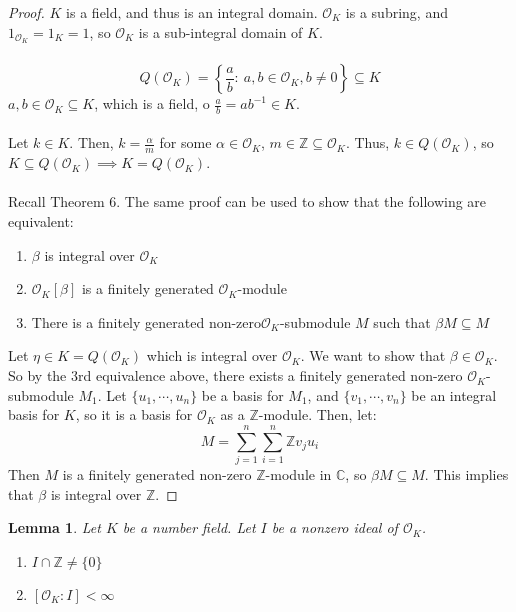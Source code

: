 \documentclass{article}
\newcommand{\C}{\mathbb{C}}
\newcommand{\air}{\mathcal{O}_K}
\newcommand{\Z}{\mathbb{Z}}
\newtheorem{lemma}{Lemma}[subsection]
\begin{document}
\begin{proof}
$K$ is a field, and thus is an integral domain. $\air$ is a subring, and $1_{\air} = 1_K = 1$, so $\air$ is a sub-integral domain of $K$.\\
\\
$$Q(\air)=\left\{\frac{a}{b}:\ a,b\in \air, b\neq 0\right\}\subseteq K$$
$a,b\in\air\subseteq K$, which is a field, o $\frac{a}{b}=ab^{-1}\in K$.
\\
\\
Let $k\in K$. Then, $k=\frac{\alpha}{m}$ for some $\alpha\in\air$, $m\in\Z\subseteq \air$. Thus, $k\in Q(\air)$, so $K\subseteq Q(\air)\implies K=Q(\air)$. \\
\\
Recall Theorem 6. The same proof can be used to show that the following are equivalent:
\begin{enumerate}
    \item $\beta$ is integral over $\air$
    \item $\air[\beta]$ is a finitely generated $\air$-module
    \item There is a finitely generated non-zero$\air$-submodule $M$ such that $\beta M\subseteq M$ 
\end{enumerate}
Let $\eta\in K=Q(\air)$ which is integral over $\air$. We want to show that $\beta\in \air$. So by the 3rd equivalence above, there exists a finitely generated non-zero $\air$-submodule $M_1$. Let $\{u_1,\cdots, u_n\}$ be a basis for $M_1$, and $\{v_1,\cdots, v_n\}$ be an integral basis for $K$, so it is a basis for $\air$ as a $\Z$-module. Then, let:
$$M=\sum_{j=1}^n\sum_{i=1}^n \Z v_ju_i$$
Then $M$ is a finitely generated non-zero $\Z$-module in $\C$, so $\beta M\subseteq M$. This implies that $\beta$ is integral over $\Z$.
\end{proof}
\begin{lemma}
Let $K$ be a number field. Let $I$ be a nonzero ideal of $\air$.
\begin{enumerate}
    \item $I\cap \Z\neq\{0\}$
    \item $[\air: I]<\infty$
\end{enumerate}
\end{lemma}
\end{document}
